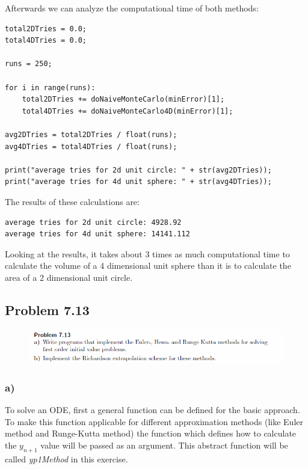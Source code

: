 Afterwards we can analyze the computational time of both methods:

\begin{lstlisting}[caption=Problem 7.12 c)]
total2DTries = 0.0;
total4DTries = 0.0;

runs = 250;

for i in range(runs):
	total2DTries += doNaiveMonteCarlo(minError)[1];
	total4DTries += doNaiveMonteCarlo4D(minError)[1];

avg2DTries = total2DTries / float(runs);
avg4DTries = total4DTries / float(runs);

print("average tries for 2d unit circle: " + str(avg2DTries));
print("average tries for 4d unit sphere: " + str(avg4DTries));
\end{lstlisting}

The results of these calculations are:

\begin{lstlisting}[caption=Result of 7.12 c), keywordstyle=\color{black}]
average tries for 2d unit circle: 4928.92
average tries for 4d unit sphere: 14141.112
\end{lstlisting}

Looking at the results, it takes about 3 times as much computational time to calculate the volume of a 4 dimensional unit sphere than it is to calculate the area of a 2 dimensional unit circle.


\subsection{Problem 7.13}


\begin{figure}[!ht]
\includegraphics[width=1\textwidth]{chapters/images/desc-7-13}
\end{figure}


\subsubsection{a)}

To solve an ODE, first a general function can be defined for the basic approach. To make this function applicable for different approximation methods (like Euler method and Runge-Kutta method) the function which defines how to calculate the $y_{n + 1}$ value will be passed as an argument. This abstract function will be called \textit{yp1Method} in this exercise.

